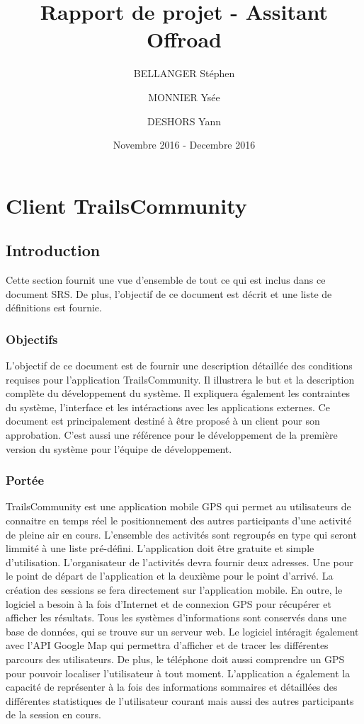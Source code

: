 \documentclass[titlepage, 12pt]{report}
\title{Rapport de projet - Assitant Offroad}
\author{BELLANGER Stéphen \and
			MONNIER Ysée \and
			DESHORS Yann}
\date{Novembre 2016 - Decembre 2016}
\begin{document}
	
\maketitle

\tableofcontents

\listoffigures 

\part{Client TrailsCommunity}

\chapter{Introduction}

Cette section fournit  une vue d'ensemble de tout ce qui est inclus dans ce document SRS. De plus, l'objectif de ce document est décrit et une liste de définitions est fournie.

\section{Objectifs}

L'objectif de ce document est de fournir une description détaillée des conditions requises pour l'application TrailsCommunity.
Il illustrera le but et la description complète du développement du système.
Il expliquera également les contraintes du système, l'interface et les intéractions avec les applications externes. Ce document est principalement destiné à être proposé à un client pour son approbation. C'est aussi une référence pour le développement de la première version du système pour l'équipe de développement.

\section{Portée}

TrailsCommunity est une application mobile GPS qui permet au utilisateurs de connaitre en temps réel le positionnement des autres participants d'une activité de pleine air en cours. L'ensemble des activités sont regroupés en type qui seront limmité à une liste pré-défini.
L'application doit être gratuite et simple d'utilisation.
L'organisateur de l'activités devra fournir deux adresses. Une pour le point de départ de l'application et la deuxième pour le point d'arrivé. La création des sessions se fera directement sur l'application mobile.
En outre, le logiciel a besoin à la fois d'Internet et de connexion GPS pour récupérer et afficher les résultats. Tous les systèmes d'informations sont conservés dans une base de données, qui se trouve sur un serveur web. Le logiciel intéragit également avec l'API Google Map qui permettra d'afficher et de tracer les différentes parcours des utilisateurs. De plus, le téléphone doit aussi comprendre un GPS pour pouvoir localiser l'utilisateur à tout moment. 
L'application a également la capacité de représenter à la fois des informations sommaires et détaillées des différentes statistiques de l'utilisateur courant mais aussi des autres participants de la session en cours.
\end{document}
